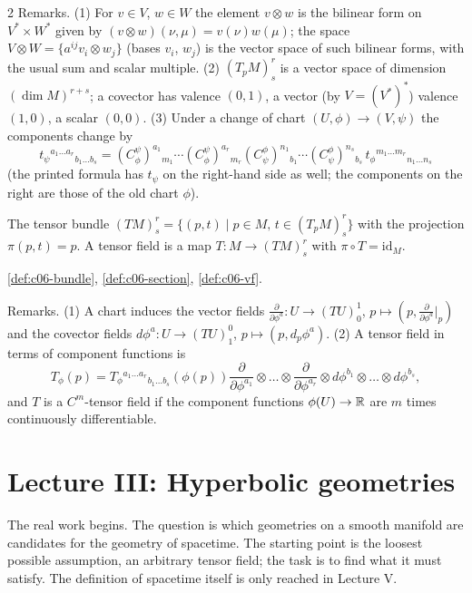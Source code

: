 \begin{paracol}{2}
Remarks. (1) For $v\in V$, $w\in W$ the element $v\otimes w$ is the bilinear form on $V^*\times W^*$ given by $(v\otimes w)(\nu,\mu)=v(\nu)w(\mu)$; the space $V\otimes W=\{a^{ij}v_i\otimes w_j\}$ (bases $v_i$, $w_j$) is the vector space of such bilinear forms, with the usual sum and scalar multiple. (2) $(T_pM)^r_s$ is a vector space of dimension $(\dim M)^{r+s}$; a covector has valence $(0,1)$, a vector (by $V=(V^*)^*$) valence $(1,0)$, a scalar $(0,0)$. (3) Under a change of chart $(U,\phi)\to(V,\psi)$ the components change by
\[
  t_\psi{}^{a_1\dots a_r}{}_{b_1\dots b_s}=(C^\psi_\phi)^{a_1}{}_{m_1}\cdots(C^\psi_\phi)^{a_r}{}_{m_r}(C^\phi_\psi)^{n_1}{}_{b_1}\cdots(C^\phi_\psi)^{n_s}{}_{b_s}\,t_\phi{}^{m_1\dots m_r}{}_{n_1\dots n_s}
\]
(the printed formula has $t_\psi$ on the right-hand side as well; the components on the right are those of the old chart $\phi$).

\begin{definition}\label{def:c29-field}
The tensor bundle $(TM)^r_s=\{(p,t)\mid p\in M,\,t\in(T_pM)^r_s\}$ with the projection $\pi(p,t)=p$. A tensor field is a map $T:M\to(TM)^r_s$ with $\pi\circ T=\mathrm{id}_M$.
\end{definition}
\begin{recall}
\cref{def:c06-bundle}, \cref{def:c06-section}, \cref{def:c06-vf}.
\end{recall}

Remarks. (1) A chart induces the vector fields $\frac{\partial}{\partial\phi^a}:U\to(TU)^1_0$, $p\mapsto(p,\frac{\partial}{\partial\phi^a}\big|_p)$ and the covector fields $d\phi^a:U\to(TU)^0_1$, $p\mapsto(p,d_p\phi^a)$. (2) A tensor field in terms of component functions is
\[
  T_\phi(p)=T_\phi{}^{a_1\dots a_r}{}_{b_1\dots b_s}(\phi(p))\frac{\partial}{\partial\phi^{a_1}}\otimes\dots\otimes\frac{\partial}{\partial\phi^{a_r}}\otimes d\phi^{b_1}\otimes\dots\otimes d\phi^{b_s},
\]
and $T$ is a $C^m$-tensor field if the component functions $\phi(U)\to\mathbb{R}$ are $m$ times continuously differentiable.

\section{Lecture III: Hyperbolic geometries}\label{sec:c29-L3}

 The real work begins. The question is which geometries on a smooth manifold are candidates for the geometry of spacetime. The starting point is the loosest possible assumption, an arbitrary tensor field; the task is to find what it must satisfy. The definition of spacetime itself is only reached in Lecture V.


\end{paracol}
